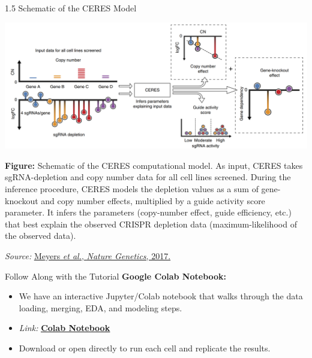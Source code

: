 \documentclass[10pt]{beamer}
\let\oldhref\href
\renewcommand{\href}[2]{\oldhref{#1}{\uline{#2}}}
\begin{document}
\begin{frame}{1.5 Schematic of the CERES Model}
\begin{center}
  \includegraphics[width=1\linewidth]{figs/CERES-computational-model.png}
\end{center}

\footnotesize
\textbf{Figure:} Schematic of the CERES computational model.
As input, CERES takes sgRNA-depletion and copy number data for all cell lines screened. During the inference procedure, CERES models the depletion values as a sum of gene-knockout and copy number effects, multiplied by a guide activity score parameter. It infers the parameters (copy-number effect, guide efficiency, etc.) that best explain the observed CRISPR depletion data (maximum-likelihood of the observed data). 

\vspace{0.2em}
\textit{Source:} 
\href{https://doi.org/10.1038/ng.3984}{Meyers \emph{et al.}, \textit{Nature Genetics}, 2017.}
\end{frame}

\begin{frame}{Follow Along with the Tutorial}
  \textbf{Google Colab Notebook:}
  \begin{itemize}
    \item We have an interactive Jupyter/Colab notebook that walks through the data loading,
          merging, EDA, and modeling steps.
    \item \textit{Link:}
      \href{https://colab.research.google.com/drive/12B8lswKoV_u2tAzg_mTVrqM9VQvqinOg}{\textbf{\underline{Colab Notebook}}}
    \item Download or open directly to run each cell and replicate the results.
  \end{itemize}
\end{frame}
\end{document}
